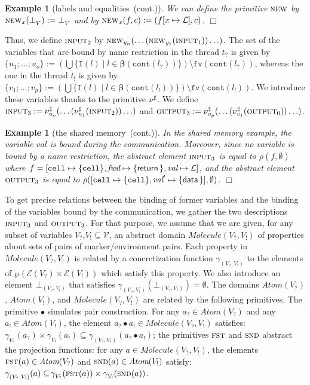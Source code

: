 \documentclass{article}
\newcommand{\bydef}{:=}
\newcommand{\boxexample}{$\Box$}
\newtheorem{example}[thm]{Example}
\newcommand{\Names}{\mathcal{V}}
\newcommand{\Labels}{\mathcal{L}}
\newcommand{\rec}{?}
\newcommand{\eme}{!}
\newcommand{\internal}[1]{\textnormal{\texttt{#1}}}
\newcommand{\data}[1]{\textsf{#1}\,}
\newcommand{\variable}[1]{\textit{#1}}
\newcommand{\cdata}{\data{data}}
\newcommand{\addread}{\data{return}}
\newcommand{\port}{\variable{fwd}}
\newcommand{\ccell}{\internal{cell}}
\newcommand{\datawrite}{\variable{val}'}
\newcommand{\dataread}{\variable{val}}
\newcommand{\FN}{\texttt{fv}}
\newcommand{\interface}{\mathtt{I}}
\newcommand{\Extract}{\mathbf{\beta}}
\newcommand{\env}[1]{\mathcal{E}(#1)}
\newcommand{\cont}{\texttt{cont}}
\newcommand{\lrec}{l_{\rec}}
\newcommand{\leme}{l_{\eme}}
\newcommand{\trec}{t_{\rec}}
\newcommand{\teme}{t_{\eme}}
\newcommand{\Vrec}{V_{\rec}}
\newcommand{\Veme}{V_{\eme}}
\newcommand{\continued}{(cont.)}
\newcommand{\Atomekey}{\textit{Atom}}
\newcommand{\Atomeshortkey}{}
\newcommand{\Atome}[1]{\Atomekey(#1)}
\newcommand{\Moleculekey}{\textit{Molecule}}
\newcommand{\Moleculeshortkey}{}
\newcommand{\Molecule}[2]{\Moleculekey(#1,#2)}
\newcommand{\gammaatome}[1]{\gamma^{\Atomeshortkey}_{#1}}
\newcommand{\botatome}[1]{\bot^{\Atomeshortkey}_{#1}}
\newcommand{\gammamolecule}[2]{\gamma^{\Moleculeshortkey}_{({#1},{#2})}}
\newcommand{\botmolecule}[2]{\bot^{\Moleculeshortkey}_{\scriptscriptstyle ({\scriptscriptstyle #1},{\scriptscriptstyle #2})}}
\newcommand{\jdeclare}{{\bf \nu}^{\sharp}}
\newcommand{\declare}{\jdeclare}
\newcommand{\jextension}{\textsc{new}}
\newcommand{\extension}{\jextension}
\newcommand{\concat}{\bullet}
\newcommand{\fst}{\textsc{fst}}
\newcommand{\snd}{\textsc{snd}}
\newcommand{\cfadomain}{labels and equalities}
\newcommand{\ccfadomain}{\cfadomain\ \continued}
\newcommand{\shareanalysis}{the shared memory}
\newcommand{\cflowanalysis}{\shareanalysis\ \continued}
\begin{document}
\begin{example}[\ccfadomain]
We can define the primitive $\extension$ by $\extension_x(\botatome{V})\bydef\botatome{V}$ and by $\extension_x(f,c)\bydef(f[x\mapsto \Labels],c)$. 
\boxexample\end{example}

Thus,  we define $\textsc{input}_2$ by $\extension_{y_n}(\ldots(\extension_{y_1}(\textsc{input}_1))\ldots)$. The set of the variables that are 
bound by name restriction in the thread $\trec$ is given by $\{u_1;\ldots;u_o\}\bydef (\bigcup \{\interface(l)\;|\;l\in \Extract(\cont(\lrec))\})\setminus \FN(\cont(\lrec))$, whereas the one in the thread $\teme$ is given by $\{v_1;\ldots;v_{p}\}\bydef(\bigcup \{\interface(l)\;|\;l\in\Extract(\cont(\leme))\}) \setminus \FN(\cont(\leme))$. We introduce these variables thanks to the primitive $\jdeclare$. We define $\textsc{input}_3 \bydef \declare_{u_o}(\ldots(\declare_{u_1}(\textsc{input}_2))\ldots)$ and  $\textsc{output}_3\bydef \declare_{v_{p}}(\ldots(\declare_{v_1}(\textsc{output}_0))\ldots)$.

\begin{example}[\cflowanalysis]
In the shared memory example, the variable $\dataread$ is bound during the communication. 
Moreover, since  no variable is bound by a name restriction, the abstract element 
$\textsc{input}_3$ is equal to $\rho(f,\emptyset)$  
where $f=[\ccell  \mapsto  \{\ccell\},\port  \mapsto \{\addread\},\dataread  \mapsto  \Labels]$, and the abstract element 
$\textsc{output}_3$ is equal to $\rho([\ccell \mapsto \{\ccell\}, \datawrite \mapsto \{\cdata\}],\emptyset)$.
\boxexample\end{example}

To get precise relations between the binding of former variables and the binding of the variables bound by the communication, we gather the two descriptions $\textsc{input}_3$ and $\textsc{output}_3$. 
For that purpose, we assume that we are given, for any subset of variables $\Vrec$,$\Veme\subseteq \Names$, 
an abstract domain $\Molecule{\Vrec}{\Veme}$ of properties about 
sets of pairs of marker/environment pairs.
Each property in $\Molecule{\Vrec}{\Veme}$ is related by a concretization function $\gammamolecule{\Vrec}{\Veme}$ to the elements of $\wp(\env{\Vrec}\times\env{\Veme})$ which satisfy this property.
We also introduce an element $\botmolecule{\Vrec}{\Veme}$ that satisfies $\gammamolecule{\Vrec}{\Veme}(\botmolecule{\Vrec}{\Veme})=\emptyset$.
The domains $\Atome{\Vrec}$, $\Atome{\Veme}$, and $\Molecule{\Vrec}{\Veme}$ are related by the following primitives. 
The primitive $\concat$ simulates pair construction.
For any $a_\rec\in \Atome{\Vrec}$ and any $a_\eme\in\Atome{\Veme}$, the element $a_\rec\concat a_\eme \in\Molecule{\Vrec}{\Veme}$ satisfies: $\gammaatome{\Vrec}(a_?)\times\gammaatome{\Veme}(a_!)\subseteq \gammamolecule{\Vrec}{\Veme}(a_?\concat a_!)$;
the primitives $\fst$ and $\snd$ abstract the projection functions: 
for any $a\in\Molecule{\Vrec}{\Veme}$, the elements $\fst(a)\in\Atome{\Vrec}$ and $\snd(a)\in\Atome{\Veme}$ satisfy:
 $\gammamolecule{\Vrec}{\Veme}(a) \subseteq \!\gammaatome{\Vrec}(\fst(a))\times\gammaatome{\Veme}(\snd(a))$.
\end{document}
